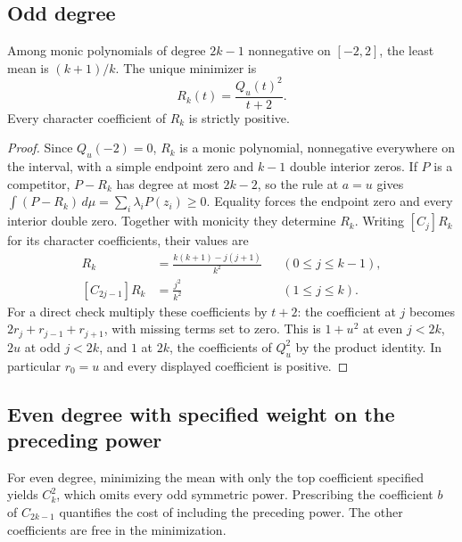 \subsection{Odd degree}
\begin{proposition}\label{prop:oddfront}
Among monic polynomials of degree $2k-1$ nonnegative on $[-2,2]$,
the least mean is $(k+1)/k$. The unique minimizer is
\[
 R_k(t)=\frac{Q_u(t)^2}{t+2}.
\]
Every character coefficient of $R_k$ is strictly positive.
\end{proposition}
\begin{proof}
Since $Q_u(-2)=0$, $R_k$ is a monic polynomial, nonnegative everywhere
on the interval, with a simple endpoint zero and $k-1$ double
interior zeros. If $P$ is a competitor, $P-R_k$ has degree at most
$2k-2$, so the rule at $a=u$ gives
$\int(P-R_k)\,d\mu=\sum_i\lambda_i P(z_i)\ge0$.
Equality forces the endpoint zero and every interior double zero.
Together with monicity they determine $R_k$. Writing $[C_j]R_k$ for
its character coefficients, their values are
\begin{align*}
 [C_{2j}]R_k&=\frac{k(k+1)-j(j+1)}{k^2}
                  &&(0\le j\le k-1),\\
 [C_{2j-1}]R_k&=\frac{j^2}{k^2}
                  &&(1\le j\le k).
\end{align*}
For a direct check multiply these coefficients by $t+2$: the coefficient
at $j$ becomes $2r_j+r_{j-1}+r_{j+1}$, with missing terms set to zero.
This is $1+u^2$ at even $j<2k$, $2u$ at odd $j<2k$, and $1$
at $2k$, the coefficients of $Q_u^2$ by the product identity.
In particular $r_0=u$ and every displayed coefficient is positive.
\end{proof}

\subsection{Even degree with specified weight on the preceding power}
For even degree, minimizing the mean with only the top coefficient
specified yields $C_k^2$, which omits every odd symmetric power.
Prescribing the coefficient $b$ of $C_{2k-1}$ quantifies the cost of
including the preceding power. The other coefficients are free in the
minimization.

